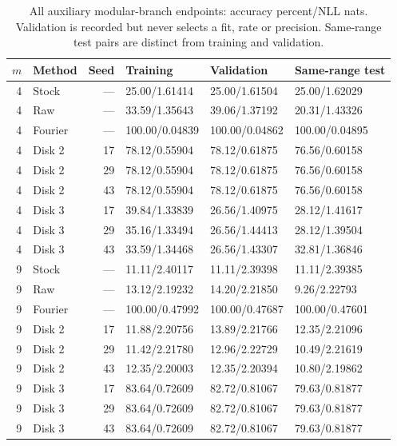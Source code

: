 \documentclass[11pt]{article}
\begin{document}
\begin{table}[htbp]
\centering\small
\caption{All auxiliary modular-branch endpoints: accuracy percent/NLL nats.
Validation is recorded but never selects a fit, rate or precision. Same-range
test pairs are distinct from training and validation.}
\label{tab:modular-auxiliary}
\begin{tabular}{rlrlll}
\toprule
$m$ & Method & Seed & Training & Validation & Same-range test\\
\midrule
4 & Stock & --- & 25.00/1.61414 & 25.00/1.61504 & 25.00/1.62029\\
4 & Raw & --- & 33.59/1.35643 & 39.06/1.37192 & 20.31/1.43326\\
4 & Fourier & --- & 100.00/0.04839 & 100.00/0.04862 & 100.00/0.04895\\
4 & Disk 2 & 17 & 78.12/0.55904 & 78.12/0.61875 & 76.56/0.60158\\
4 & Disk 2 & 29 & 78.12/0.55904 & 78.12/0.61875 & 76.56/0.60158\\
4 & Disk 2 & 43 & 78.12/0.55904 & 78.12/0.61875 & 76.56/0.60158\\
4 & Disk 3 & 17 & 39.84/1.33839 & 26.56/1.40975 & 28.12/1.41617\\
4 & Disk 3 & 29 & 35.16/1.33494 & 26.56/1.44413 & 28.12/1.39504\\
4 & Disk 3 & 43 & 33.59/1.34468 & 26.56/1.43307 & 32.81/1.36846\\
9 & Stock & --- & 11.11/2.40117 & 11.11/2.39398 & 11.11/2.39385\\
9 & Raw & --- & 13.12/2.19232 & 14.20/2.21850 & 9.26/2.22793\\
9 & Fourier & --- & 100.00/0.47992 & 100.00/0.47687 & 100.00/0.47601\\
9 & Disk 2 & 17 & 11.88/2.20756 & 13.89/2.21766 & 12.35/2.21096\\
9 & Disk 2 & 29 & 11.42/2.21780 & 12.96/2.22729 & 10.49/2.21619\\
9 & Disk 2 & 43 & 12.35/2.20003 & 12.35/2.20394 & 10.80/2.19862\\
9 & Disk 3 & 17 & 83.64/0.72609 & 82.72/0.81067 & 79.63/0.81877\\
9 & Disk 3 & 29 & 83.64/0.72609 & 82.72/0.81067 & 79.63/0.81877\\
9 & Disk 3 & 43 & 83.64/0.72609 & 82.72/0.81067 & 79.63/0.81877\\
\bottomrule
\end{tabular}
\end{table}
\end{document}
